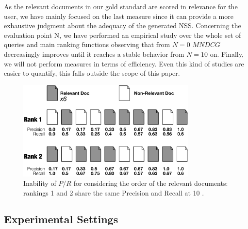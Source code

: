 \documentclass{llncs}
\begin{document}
As the relevant documents in our gold standard are scored in relevance for the user, we have mainly focused on the last measure since it can provide a more exhaustive judgment about the adequacy of the generated NSS. Concerning the evaluation point N, we have performed an empirical study over the whole set of queries and main ranking functions observing that from $N=0$ $MNDCG$ decreasingly improves until it reaches a stable behavior from $N=10$ on. Finally, we will not perform measures in terms of efficiency. Even this kind of studies are easier to quantify, this falls outside the scope of this paper.
\begin{figure}[h!]
\centering
\includegraphics[width=0.8\textwidth]{figure/precisionRecall}
\caption{Inability of $P/R$ for considering the order of the relevant documents: rankings 1 and 2 share the same Precision and Recall at 10 .}
\label{fig:precisionRecall}%
\end{figure}

\subsection{Experimental Settings}
\label{sec:experimentalSettings}
\end{document}
